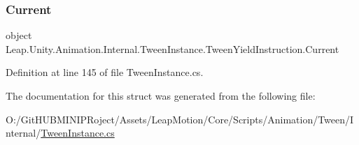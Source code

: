 \subsubsection{\texorpdfstring{Current}{Current}}
{\footnotesize\ttfamily object Leap.\+Unity.\+Animation.\+Internal.\+Tween\+Instance.\+Tween\+Yield\+Instruction.\+Current\hspace{0.3cm}{\ttfamily [get]}}



Definition at line 145 of file Tween\+Instance.\+cs.



The documentation for this struct was generated from the following file\+:\begin{DoxyCompactItemize}
\item 
O\+:/\+Git\+H\+U\+B\+M\+I\+N\+I\+P\+Roject/\+Assets/\+Leap\+Motion/\+Core/\+Scripts/\+Animation/\+Tween/\+Internal/\mbox{\hyperlink{_tween_instance_8cs}{Tween\+Instance.\+cs}}\end{DoxyCompactItemize}
